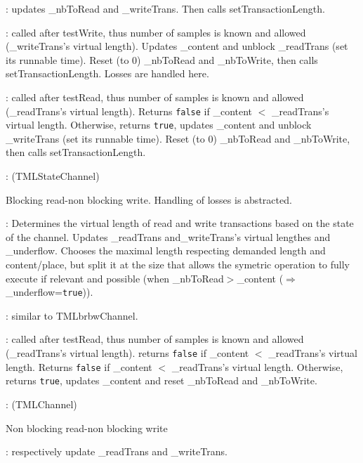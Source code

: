 \documentclass[a4paper,11pt]{article}
\newcommand{\bfont}{\fontseries{b}\selectfont}
\newcommand{\cod}[1]{{\ttfamily #1}}
\newcommand{\class}[2]{\par\vspace{1mm}\hspace{-5mm}\large\colorbox{file}{\textbullet\bfont\cod{#1}:} (\cod{#2})\par}
\newcommand{\method}[1]{\par\vspace{1mm}\hspace{-2mm}\colorbox{method}{\textopenbullet\bfont\cod{#1}:}}
\begin{document}
\method{testwrite} updates \cod{\_nbToRead} and \cod{\_writeTrans}. Then calls \cod{setTransactionLength}.

\method{write()} called after \cod{testWrite}, thus number of samples is known and allowed (\cod{\_wri\-te\-Trans}'s virtual length). Updates \cod{\_content} and unblock \cod{\_readTrans} (set its runnable time). Reset (to 0) \cod{\_nbToRead} and \cod{\_nbToWrite}, then calls \cod{setTransactionLength}. Losses are handled here.
\method{read()} called after \cod{testRead}, thus number of samples is known and allowed (\cod{\_read\-Trans}'s virtual length). Returns {\tt false} if \cod{\_content} $<$ \cod{\_readTrans}'s virtual length. Otherwise, returns {\tt true}, updates  \cod{\_content} and unblock \cod{\_writeTrans} (set its runnable time). Reset (to 0) \cod{\_nbToRead} and \cod{\_nbToWrite}, then calls \cod{setTransactionLength}.

\class{TMLbrnbwChannel}{TMLStateChannel}
Blocking read-non blocking write. Handling of losses is abstracted.
\method{setTransactionLength()} Determines the virtual length of read and write transactions based on the state of the channel. Updates \cod{\_readTrans} and\cod{\_writeTrans}'s virtual lengthes and \cod{\_underflow}. Chooses the maximal length respecting demanded length and content/place, but split it at the size that allows the symetric operation to fully execute if relevant and possible (when \cod{\_nbToRead}$>${\_content} ($\Rightarrow$ \cod{\_underflow}={\tt true})).

\method{testWrite(iTrans), testRead(iTrans), write()} similar to \cod{TMLbrbwChannel}.

\method{read()} called after \cod{testRead}, thus number of samples is known and allowed (\cod{\_read\-Trans}'s virtual length). returns {\tt false} if \cod{\_content} $<$ \cod{\_readTrans}'s virtual length. Returns {\tt false} if \cod{\_content} $<$ \cod{\_readTrans}'s virtual length. Otherwise, returns {\tt true}, updates  \cod{\_content} and reset \cod{\_nbToRead} and \cod{\_nbToWrite}.

\class{TMLnbrnbwChannel}{TMLChannel}
Non blocking read-non blocking write

\method{testWrite(iTrans), testRead(iTrans)} respectively update \cod{\_readTrans} and \cod{\_wri\-teTrans}.
\end{document}
